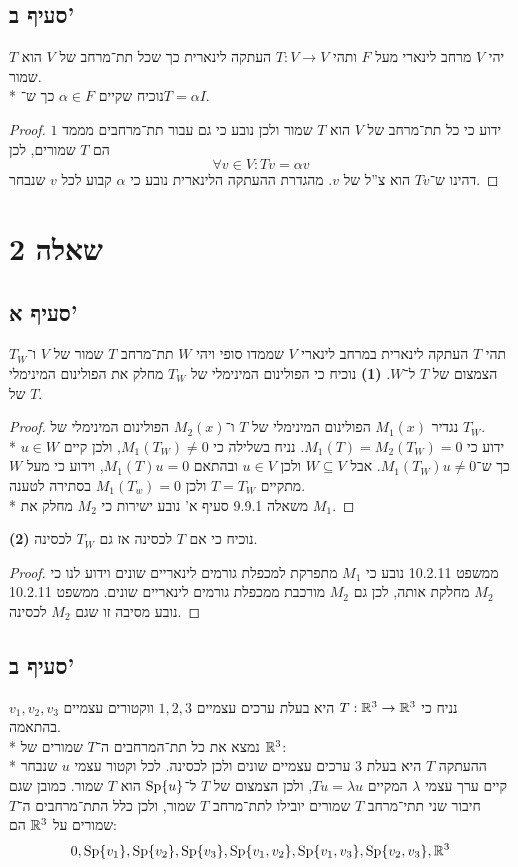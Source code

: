\subsection{סעיף ב'}
יהי $V$ מרחב לינארי מעל $F$ ותהי $T : V \to V$ העתקה לינארית כך שכל תת־מרחב של $V$ הוא $T$ שמור. \\*
נוכיח שקיים $\alpha \in F$ כך ש־$T = \alpha I$.
\begin{proof}
	ידוע כי כל תת־מרחב של $V$ הוא $T$ שמור ולכן נובע כי גם עבור תת־מרחבים מממד $1$ הם $T$ שמורים, לכן
	\[
		\forall v \in V: T v = \alpha v
	\]
	דהינו ש־$T v$ הוא צ''ל של $v$. מהגדרת ההעתקה הלינארית נובע כי $\alpha$ קבוע לכל $v$ שנבחר.
\end{proof}

\section{שאלה 2}
\subsection{סעיף א'}
תהי $T$ העתקה לינארית במרחב לינארי $V$ שממדו סופי ויהי $W$ תת־מרחב $T$ שמור של $V$ ו־$T_W$ הצמצום של $T$ ל־$W$.
\textbf{(1)}
נוכיח כי הפולינום המינימלי של $T_W$ מחלק את הפולינום המינימלי של $T$.
\begin{proof}
	נגדיר $M_1(x)$ הפולינום המינימלי של $T$ ו־$M_2(x)$ הפולינום המינימלי של $T_W$. \\*
	ידוע כי $M_1(T) = M_2(T_W) = 0$. נניח בשלילה כי $M_1(T_W) \ne 0$, ולכן קיים $u \in W$ כך ש־$M_1(T_W) u \ne 0$.
	אבל $W \subseteq V$ ולכן $u \in V$ ובהתאם $M_1(T) u = 0$, וידוע כי מעל $W$ מתקיים $T = T_W$ ולכן $M_1(T_w) = 0$ בסתירה לטענה. \\*
	משאלה 9.9.1 סעיף א' נובע ישירות כי $M_2$ מחלק את $M_1$.
\end{proof}
\textbf{(2)}
נוכיח כי אם $T$ לכסינה אז גם $T_W$ לכסינה.
\begin{proof}
	ממשפט 10.2.11 נובע כי $M_1$ מתפרקת למכפלת גורמים לינאריים שונים וידוע לנו כי $M_2$ מחלקת אותה,
	לכן גם $M_2$ מורכבת ממכפלת גורמים לינאריים שונים. ממשפט 10.2.11 נובע מסיבה זו שגם $M_2$ לכסינה.
\end{proof}

\subsection{סעיף ב'}
נניח כי $T : \mathbb{R}^3 \to \mathbb{R}^3$ היא בעלת ערכים עצמיים $1, 2, 3$ ווקטורים עצמיים $v_1, v_2, v_3$ בהתאמה. \\*
נמצא את כל תת־המרחבים ה־$T$ שמורים של $\mathbb{R}^3$: \\*
ההעתקה $T$ היא בעלת $3$ ערכים עצמיים שונים ולכן לכסינה. לכל וקטור עצמי $u$ שנבחר קיים ערך עצמי $\lambda$ המקיים $T u = \lambda u$,
ולכן הצמצום של $T$ ל־$\operatorname{Sp}\{ u \}$ הוא $T$ שמור.
כמובן שגם חיבור שני תתי־מרחב $T$ שמורים יובילו לתת־מרחב $T$ שמור, ולכן כלל התת־מרחבים ה־$T$ שמורים על $\mathbb{R}^3$ הם:
\[
	0,
	\operatorname{Sp}\{ v_1 \},
	\operatorname{Sp}\{ v_2 \},
	\operatorname{Sp}\{ v_3 \},
	\operatorname{Sp}\{ v_1, v_2 \},
	\operatorname{Sp}\{ v_1, v_3 \},
	\operatorname{Sp}\{ v_2, v_3 \},
	\mathbb{R}^3
\]

